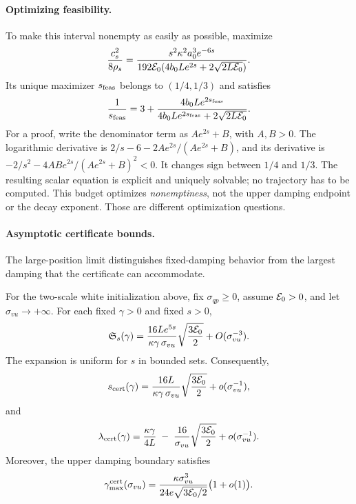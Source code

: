 \paragraph{Optimizing feasibility.}
To make this interval nonempty as easily as possible, maximize
\begin{equation}\label{eq:budget}
 \frac{c_s^2}{8\rho_s}
 =\frac{s^2\kappa^2a_0^3e^{-6s}}
 {192\mathcal E_0(4b_0Le^{2s}+2\sqrt{2L\mathcal E_0})}.
\end{equation}
Its unique maximizer $s_{\rm feas}$ belongs to $(1/4,1/3)$ and satisfies
\begin{equation}\label{eq:best-budget}
 \frac1{s_{\rm feas}}
 =3+\frac{4b_0Le^{2s_{\rm feas}}}
 {4b_0Le^{2s_{\rm feas}}+2\sqrt{2L\mathcal E_0}}.
\end{equation}
For a proof, write the denominator term as $Ae^{2s}+B$, with $A,B>0$.
The logarithmic derivative is $2/s-6-2Ae^{2s}/(Ae^{2s}+B)$, and its
derivative is $-2/s^2-4ABe^{2s}/(Ae^{2s}+B)^2<0$.
It changes sign between $1/4$ and $1/3$. The resulting scalar equation
is explicit and uniquely solvable; no trajectory has to be computed.
This budget optimizes \emph{nonemptiness}, not the upper damping endpoint
or the decay exponent. Those are different optimization questions.


\paragraph{Asymptotic certificate bounds.}
The large-position limit distinguishes fixed-damping behavior from the
largest damping that the certificate can accommodate.
\begin{proposition}
\label{prop:large-position-scale-certificate}\label{prop:large-position}
For the two-scale white initialization above, fix \(\sigma_{qp}\ge0\), assume
\(\mathcal E_0>0\), and
let \(\sigma_{vu}\to+\infty\).  For each fixed \(\gamma>0\) and fixed
\(s>0\),
\[
\mathfrak S_s(\gamma)
=
\frac{16Le^{5s}}{\kappa\gamma\,\sigma_{vu}}
\sqrt{\frac{3\mathcal E_0}{2}}
+O(\sigma_{vu}^{-3}).
\]
The expansion is uniform for \(s\) in bounded sets.  Consequently,
\[
s_{\mathrm{cert}}(\gamma)
=
\frac{16L}{\kappa\gamma\,\sigma_{vu}}
\sqrt{\frac{3\mathcal E_0}{2}}
+o(\sigma_{vu}^{-1}),
\]
and
\[
\lambda_{\mathrm{cert}}(\gamma)
=
\frac{\kappa\gamma}{4L}
\;-\;
\frac{16}{\sigma_{vu}}\sqrt{\frac{3\mathcal E_0}{2}}
+o(\sigma_{vu}^{-1}).
\]
Moreover, the upper damping boundary satisfies
\[
\gamma^{\mathrm{cert}}_{\max}(\sigma_{vu})
=
\frac{\kappa\sigma_{vu}^3}
{24e\sqrt{3\mathcal E_0/2}}
\bigl(1+o(1)\bigr).
\]
\end{proposition}

